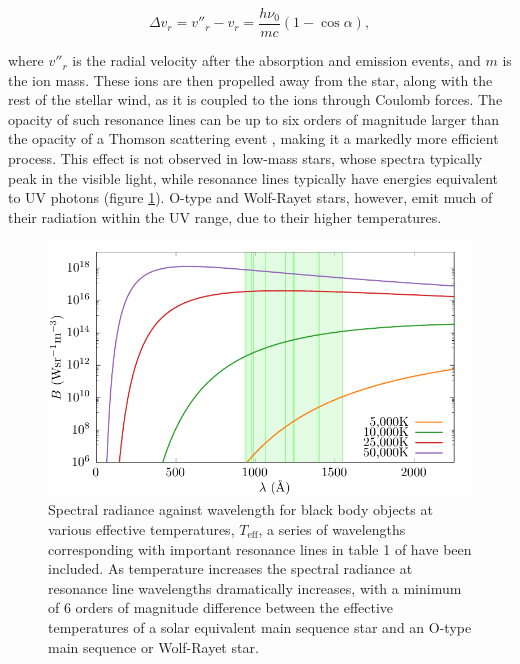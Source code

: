 \begin{equation}
  \Delta v_r = v''_r - v_r = \frac{h\nu_0}{mc} (1-\cos\alpha),
\end{equation}

\noindent
where $v''_r$ is the radial velocity after the absorption and emission events, and $m$ is the ion mass.
These ions are then propelled away from the star, along with the rest of the stellar wind, as it is coupled to the ions through Coulomb forces.
The opacity of such resonance lines can be up to six orders of magnitude larger than the opacity of a Thomson scattering event \parencite{lamersIntroductionStellarWinds1999}, making it a markedly more efficient process.
This effect is not observed in low-mass stars, whose spectra typically peak in the visible light, while resonance lines typically have energies equivalent to UV photons (figure \ref{fig:planck-comp}).
O-type and Wolf-Rayet stars, however, emit much of their radiation within the UV range, due to their higher temperatures.

\begin{figure}
  \centering
  \includegraphics{assets/plancks-law/plancks-law.pdf}
  \caption[Planck's law radiance comparison with resonance lines]{Spectral radiance against wavelength for black body objects at various effective temperatures, $T_{\text{eff}}$, a series of wavelengths corresponding with important resonance lines in table 1 of \textcite{lucy_mass_1970} have been included. As temperature increases the spectral radiance at resonance line wavelengths dramatically increases, with a minimum of 6 orders of magnitude difference between the effective temperatures of a solar equivalent main sequence star and an O-type main sequence or Wolf-Rayet star.}
  \label{fig:planck-comp}
\end{figure}

